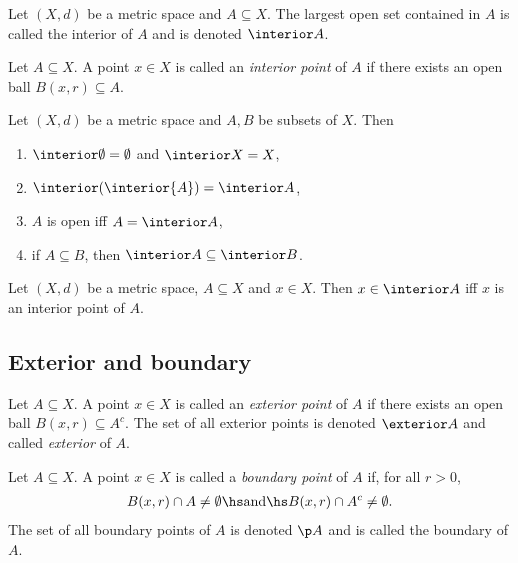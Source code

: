 \documentclass{article}
\begin{document}
\begin{definition}
	Let $(X,d)$ be a metric space and $A\subseteq X$. The largest open set contained in $A$
	is called the interior of $A$ and is denoted $\interior A$.
\end{definition}

\begin{definition}
	Let $A\subseteq X$. A point $x\in X$ is called an \emph{interior point} of $A$ if
	there exists an open ball $B(x,r)\subseteq A$.
\end{definition}

\begin{proposition}[4.24]
	Let $(X,d)$ be a metric space and $A,B$ be subsets of $X$. Then
	\begin{enumerate}
		\item $\interior\emptyset=\emptyset$ and $\interior X=X$,
		\item $\interior(\interior{A})=\interior A$,
		\item $A$ is open iff $A=\interior A$,
		\item if $A\subseteq B$, then $\interior A\subseteq\interior B$.
	\end{enumerate}
\end{proposition}

\begin{proposition}[4.25]
	Let $(X,d)$ be a metric space, $A\subseteq X$ and $x\in X$. Then $x\in\interior A$ iff
	$x$ is an interior point of $A$.
\end{proposition}

\subsection{Exterior and boundary}

\begin{definition}
	Let $A\subseteq X$. A point $x\in X$ is called an \emph{exterior point} of $A$ if
	there exists an open ball $B(x,r)\subseteq A^c$. The set of all exterior points is denoted
	$\exterior A$ and called \emph{exterior} of $A$.
\end{definition}

\begin{definition}
	Let $A\subseteq X$. A point $x\in X$ is called a \emph{boundary point} of $A$ if, for all
	$r>0$,
	\begin{align*}
		B(x,r)\cap A\not=\emptyset\hs\text{and}\hs B(x,r)\cap A^c\not=\emptyset.
	\end{align*}
	The set of all boundary points of $A$ is denoted $\p A$ and is called the boundary of $A$.
\end{definition}
\end{document}
